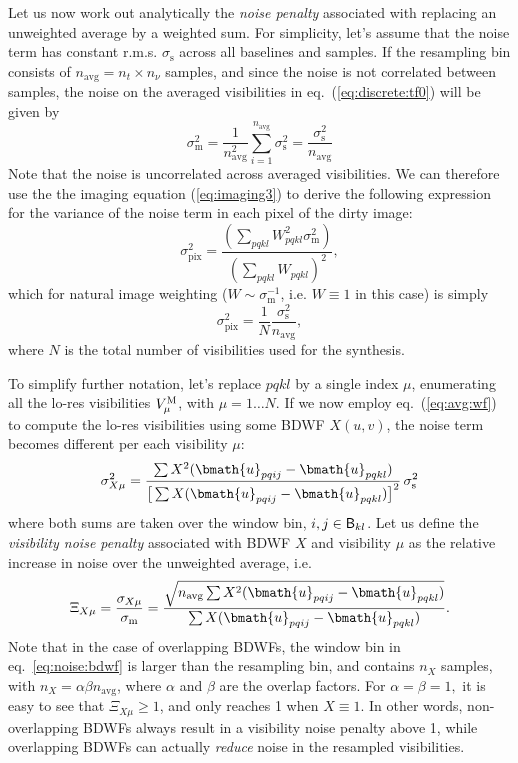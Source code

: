 \documentclass[useAMS,usenatbib]{mn2e}
\begin{document}
Let us now work out analytically the \emph{noise penalty} associated with replacing an unweighted average by 
a weighted sum. For simplicity, let's assume that the noise term
has constant r.m.s. $\sigma_\mathrm{s}$ across all baselines and samples. If the resampling bin 
consists of $n_\mathrm{avg} = n_t\times n_\nu$ samples, and since the noise is not correlated between samples, 
the noise on the averaged visibilities in eq.~(\ref{eq:discrete:tf0}) will be given by
\begin{equation}
\sigma_\mathrm{m}^2 = \frac{1}{n_\mathrm{avg}^2} \sum_{i=1}^{n_\mathrm{avg}} \sigma_\mathrm{s}^2  = \frac{\sigma_\mathrm{s}^2}{n_\mathrm{avg}}
\end{equation}
Note that the noise is uncorrelated across averaged visibilities. We can therefore use the
the imaging equation (\ref{eq:imaging3}) to derive the following expression for the variance of the noise 
term in each pixel of the dirty image:
\begin{equation}
\label{eq:noise:image}
\sigma_\mathrm{pix}^2 = \frac{ (\sum_{pqkl} W_{pqkl}^2 \sigma_\mathrm{m}^2) }{ (\sum_{pqkl} W_{pqkl})^2 },
\end{equation}
which for natural image weighting ($W\sim\sigma^{-1}_\mathrm{m}$, i.e. $W\equiv1$ in this case) is simply
\begin{equation}
\sigma_\mathrm{pix}^2 = \frac{1}{N}\frac{\sigma_\mathrm{s}^2}{n_\mathrm{avg}},
\end{equation}
where $N$ is the total number of visibilities used for the synthesis.

To simplify further notation, let's replace $pqkl$ by a single index $\mu$, enumerating all the lo-res visibilities $V^\mathrm{M}_\mu$, with 
$\mu=1\dots N$. If we now employ eq.~(\ref{eq:avg:wf}) to compute the lo-res visibilities using some BDWF $X(u,v)$, the noise 
term becomes different per each visibility $\mu$:
\begin{equation}
\label{eq:noise:bdwf}
\sigma_{X\mu}^2 = \frac{\sum X^2(\bmath{u}_{pqij}-\bmath{u}_{pqkl})}
{\big [ \sum X(\bmath{u}_{pqij}-\bmath{u}_{pqkl}) \big ]^2 } \, \sigma_\mathrm{s}^2
\end{equation}
where both sums are taken over the window bin, ${i,j}\in \mathsf{B}_{kl}$. Let us define 
the \emph{visibility noise penalty} associated with BDWF $X$ 
and visibility $\mu$ as the relative increase in noise over the unweighted average, i.e.
\begin{equation}
\Xi_{X\mu} = \frac{\sigma_{X\mu}}{\sigma_\mathrm{m}} = 
\frac{ \sqrt{ n_\mathrm{avg} \sum X^2(\bmath{u}_{pqij}-\bmath{u}_{pqkl}) }}
{\sum X(\bmath{u}_{pqij}-\bmath{u}_{pqkl}) }. 
\end{equation}
Note that in the case of overlapping BDWFs, the window bin in eq.~\ref{eq:noise:bdwf} is larger than the 
resampling bin, and contains $n_X$ samples, with $n_X=\alpha\beta n_\mathrm{avg}$, where $\alpha$ and $\beta$ are the 
overlap factors. For $\alpha=\beta=1,$ it is easy to see that $\Xi_{X\mu}\geq1$, and only reaches 1 when $X\equiv1$. 
In other words, non-overlapping BDWFs always result in a visibility noise penalty above 1, while overlapping BDWFs 
can actually \emph{reduce} noise in the resampled visibilities. 
\end{document}
